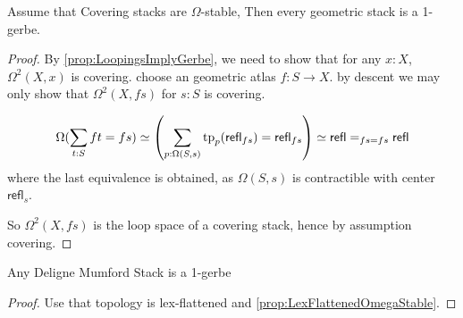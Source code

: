 \documentclass{article}
\newcommand{\refl}{\mathsf{refl}}
\begin{document}
\begin{theorem}
	Assume that Covering stacks are $\Omega$-stable, %
	Then every geometric stack is a 1-gerbe. %
\end{theorem}
\begin{proof}
	By \ref{prop:LoopingsImplyGerbe}, we need to show that for any $x : X$, $\Omega^2(X,x)$ is covering.
	choose an geometric atlas $f : S \to X$. by descent we may only show that $\Omega^2(X , fs)$ for $s : S$ is covering.
	
	\[
	\Omega(\sum_{t : S} ft = fs) \simeq \left (\sum_{p : \Omega(S,s)} \tp_p (\refl_{f s}) = \refl_{f s} \right) \simeq \refl =_{f s = f s} \refl
	\]
	where the last equivalence is obtained, as $\Omega(S,s)$ is contractible with center $\refl_s$.
	
	So $\Omega^2(X,fs)$ is the loop space of a covering stack, hence by assumption covering.
\end{proof}
\begin{corollary}
	Any Deligne Mumford Stack is a 1-gerbe
\end{corollary}
\begin{proof}
	Use that \etale topology is lex-flattened and \ref{prop:LexFlattenedOmegaStable}.
\end{proof}
\end{document}
